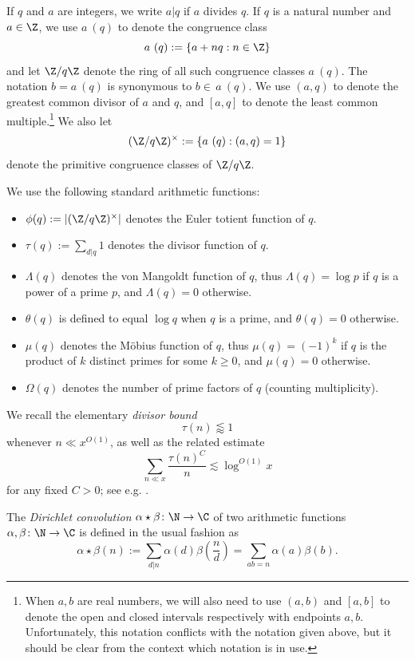 If $q$ and $a$ are integers, we write $a|q$ if $a$ divides $q$.
If $q$ is a natural number and $a \in \Z$, we use $a\ (q)$ to denote
the congruence class
$$ a\ (q) := \{ a+nq: n \in \Z \}$$
and let $\Z/q\Z$ denote the ring of all such congruence classes $a\
(q)$. The notation $b=a\ (q)$ is synonymous to $b \in \, a \ (q)$. We
use $(a,q)$ to denote the greatest common divisor of $a$ and $q$, and
$[a,q]$ to denote the least common
multiple.\footnote{When $a,b$ are real numbers, we will also
  need to use $(a,b)$ and $[a,b]$ to denote the open and closed
  intervals respectively with endpoints $a,b$.  Unfortunately, this
  notation conflicts with the notation given above, but it should be
  clear from the context which notation is in use.}
We also let
$$ (\Z/q\Z)^\times := \{ a\ (q): (a,q)=1 \}$$
denote the primitive congruence classes of $\Z/q\Z$.  

We use the following standard arithmetic functions:
\begin{itemize}
\item[(i)] $\phi(q) := |(\Z/q\Z)^\times|$ denotes the Euler totient function of $q$.
\item[(ii)] $\tau(q) := \sum_{d|q} 1$ denotes the divisor function of $q$.
\item[(iii)] $\Lambda(q)$ denotes the von Mangoldt function of $q$, thus $\Lambda(q)=\log p$ if $q$ is a power of a prime $p$, and $\Lambda(q)=0$ otherwise.
\item[(iv)] $\theta(q)$ is defined to equal $\log q$ when $q$ is a prime, and $\theta(q)=0$ otherwise.
\item[(v)] $\mu(q)$ denotes the M\"obius function of $q$, thus $\mu(q) = (-1)^k$ if $q$ is the product of $k$ distinct primes for some $k \geq 0$, and $\mu(q)=0$ otherwise.
\item[(vi)] $\Omega(q)$ denotes the number of prime factors of $q$ (counting multiplicity).
\end{itemize}

We recall the elementary \emph{divisor bound}
\begin{equation}\label{divisor-bound}
\tau(n) \lessapprox 1
\end{equation}
whenever $n \ll x^{O(1)}$, as well as the related estimate
\begin{equation}\label{divisor-2}
\sum_{n \ll x} \frac{\tau(n)^C}{n} \lesssim \log^{O(1)} x
\end{equation}
for any fixed $C>0$; see e.g. \cite[Lemma 1.5]{polymath8a}.

The \emph{Dirichlet convolution} $\alpha \star \beta \colon \N \to \C$
of two arithmetic functions $\alpha,\beta \colon \N \to \C$ is defined
in the usual fashion as
$$ \alpha\star\beta(n) := \sum_{d|n} \alpha(d)
\beta\left(\frac{n}{d}\right) =\sum_{ab=n}{\alpha(a)\beta(b)}.$$

